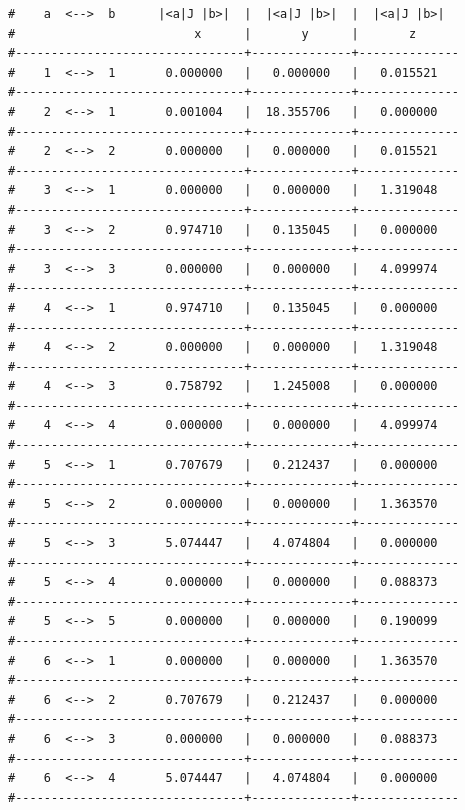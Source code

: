 \begin{enumerate}
{\begin{verbatim}
#    a  <-->  b      |<a|J |b>|  |  |<a|J |b>|  |  |<a|J |b>|  
#                         x      |       y      |       z      
#--------------------------------+--------------+--------------
#    1  <-->  1       0.000000   |   0.000000   |   0.015521   
#--------------------------------+--------------+--------------
#    2  <-->  1       0.001004   |  18.355706   |   0.000000   
#--------------------------------+--------------+--------------
#    2  <-->  2       0.000000   |   0.000000   |   0.015521   
#--------------------------------+--------------+--------------
#    3  <-->  1       0.000000   |   0.000000   |   1.319048   
#--------------------------------+--------------+--------------
#    3  <-->  2       0.974710   |   0.135045   |   0.000000   
#--------------------------------+--------------+--------------
#    3  <-->  3       0.000000   |   0.000000   |   4.099974   
#--------------------------------+--------------+--------------
#    4  <-->  1       0.974710   |   0.135045   |   0.000000   
#--------------------------------+--------------+--------------
#    4  <-->  2       0.000000   |   0.000000   |   1.319048   
#--------------------------------+--------------+--------------
#    4  <-->  3       0.758792   |   1.245008   |   0.000000   
#--------------------------------+--------------+--------------
#    4  <-->  4       0.000000   |   0.000000   |   4.099974   
#--------------------------------+--------------+--------------
#    5  <-->  1       0.707679   |   0.212437   |   0.000000   
#--------------------------------+--------------+--------------
#    5  <-->  2       0.000000   |   0.000000   |   1.363570   
#--------------------------------+--------------+--------------
#    5  <-->  3       5.074447   |   4.074804   |   0.000000   
#--------------------------------+--------------+--------------
#    5  <-->  4       0.000000   |   0.000000   |   0.088373   
#--------------------------------+--------------+--------------
#    5  <-->  5       0.000000   |   0.000000   |   0.190099   
#--------------------------------+--------------+--------------
#    6  <-->  1       0.000000   |   0.000000   |   1.363570   
#--------------------------------+--------------+--------------
#    6  <-->  2       0.707679   |   0.212437   |   0.000000   
#--------------------------------+--------------+--------------
#    6  <-->  3       0.000000   |   0.000000   |   0.088373   
#--------------------------------+--------------+--------------
#    6  <-->  4       5.074447   |   4.074804   |   0.000000   
#--------------------------------+--------------+--------------

\end{verbatim}}
\end{enumerate}
